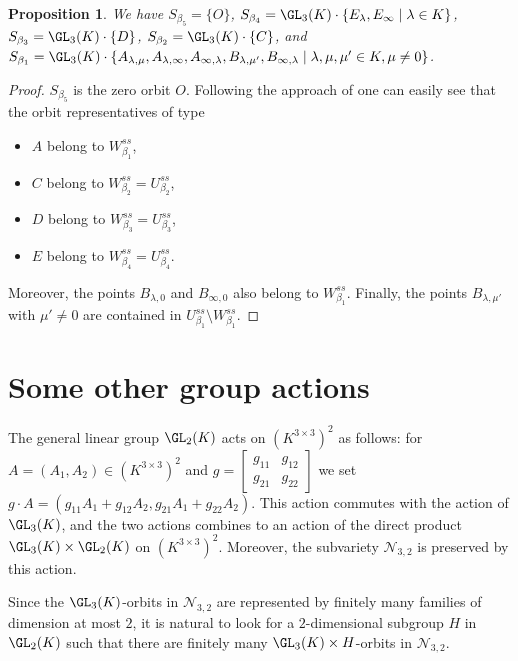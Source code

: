 \documentclass[12pt]{amsart}
\newtheorem{proposition}[theorem]{\bf Proposition}
\newcommand{\field}{K}
\begin{document}
\begin{proposition} 
We have $S_{\beta_5}=\{O\}$, 
$S_{\beta_4}=\GL_3(\field)\cdot \{E_\lambda,E_\infty\mid \lambda\in\field\}$, 
 $S_{\beta_3}=\GL_3(\field)\cdot \{D\}$,   
$S_{\beta_2}=\GL_3(\field)\cdot \{C\}$, 
and 
$S_{\beta_1}=\GL_3(\field)\cdot \{A_{\lambda,\mu}, 
A_{\lambda,\infty},A_{\infty,\lambda},B_{\lambda,\mu'},
B_{\infty,\lambda}\mid \lambda,\mu,\mu' \in \field, \mu\neq 0\}$. 
\end{proposition}

\begin{proof} 
$S_{\beta_5}$ is the zero orbit $O$. 
Following the approach of \cite{lebruyn} one can easily see that 
the orbit representatives of type 
\begin{itemize}
    \item $A$ belong to $W_{\beta_1}^{ss}$, 
    \item $C$ belong to $W_{\beta_2}^{ss}=U_{\beta_2}^{ss}$, 
    \item $D$ belong to $W_{\beta_3}^{ss}=U_{\beta_3}^{ss}$, 
    \item $E$ belong to $W_{\beta_4}^{ss}=U_{\beta_4}^{ss}$. 
\end{itemize}
Moreover, the points $B_{\lambda,0}$ and $B_{\infty,0}$ also belong to 
$W_{\beta_1}^{ss}$. Finally, the points $B_{\lambda,\mu'}$ with $\mu' \neq 0$ are contained in $U_{\beta_1}^{ss}\setminus W_{\beta_1}^{ss}$.     \end{proof}


\section{Some other group actions}\label{sec:GL3xGL2}

The general linear group $\GL_2(\field)$ acts on $(\field^{3\times 3})^2$ as follows: 
for $A=(A_1,A_2)\in (\field^{3\times 3})^2$ and 
$g=\begin{bmatrix}g_{11}&g_{12}\\g_{21}&g_{22}\end{bmatrix}$ we set 
$g\cdot A=(g_{11}A_1+g_{12}A_2,g_{21}A_1+g_{22}A_2)$. 
This action commutes with the action of $\GL_3(\field)$, and the two actions combines to an action 
of the direct product $\GL_3(\field)\times \GL_2(\field)$ on $(\field^{3\times 3})^2$. 
Moreover, the subvariety $\mathcal{N}_{3,2}$ is preserved by this action.  

Since the $\GL_3(\field)$-orbits in $\mathcal{N}_{3,2}$ are represented by finitely many 
families of dimension at most $2$, 
it is natural to look for a $2$-dimensional subgroup $H$ in 
$\GL_2(\field)$ such that there are finitely many 
$\GL_3(\field)\times H$-orbits in $\mathcal{N}_{3,2}$. 
\end{document}

